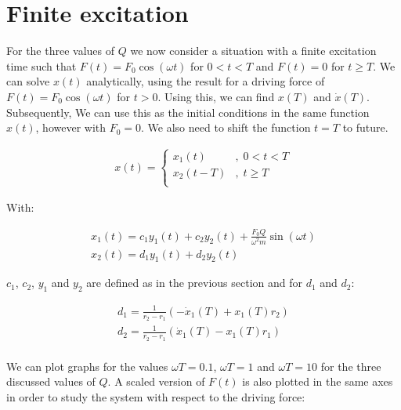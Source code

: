 \section{Finite excitation}

For the three values of $Q$ we now consider a situation with a finite excitation time such that $F(t) = F_0 \cos(\omega t)$ for $0 < t < T$ and $F(t) = 0$ for $t \geq T$. We can solve $x(t)$ analytically, using the result for a driving force of $F(t) = F_0 \cos(\omega t)$ for $t > 0$. Using this, we can find $x(T)$ and $\dot{x}(T)$. Subsequently, We can use this as the initial conditions in the same function $x(t)$, however with $F_0 = 0$. We also need to shift the function $t=T$ to future.

\begin{align*}
	x(t) = \begin{cases}
		x_1(t) & , \; 0 < t < T \\
		x_2(t-T) & , \; t \geq T \\
		\end{cases}
\end{align*}

With:

\begin{align*}
	x_1(t) = c_1 y_1(t) + c_2 y_2(t) + \frac{F_0 Q}{\omega^2 m}\sin(\omega t) \\
	x_2(t) = d_1 y_1(t) + d_2 y_2(t)
\end{align*}

$c_1$, $c_2$, $y_1$ and $y_2$ are defined as in the previous section and for $d_1$ and $d_2$:

\begin{align*}
	d_1 = \frac{1}{r_2-r_1} \left( -\dot{x}_1(T) + x_1(T) r_2 \right) \\
	d_2 = \frac{1}{r_2-r_1} \left( \dot{x}_1(T)  - x_1(T) r_1 \right) \\
\end{align*}

We can plot graphs for the values $\omega T = 0.1$, $\omega T = 1$ and $\omega T = 10$ for the three discussed values of $Q$. A scaled version of $F(t)$ is also plotted in the same axes in order to study the system with respect to the driving force:

